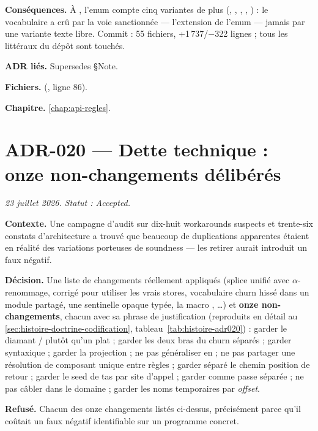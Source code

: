 \textbf{Conséquences.} À \code{\snapshotCommit}, l'enum  compte
cinq variantes de plus (, , ,
, ) : le vocabulaire a crû par la voie
sanctionnée --- l'extension de l'enum --- jamais par une variante texte libre.
Commit  : 55 fichiers, +1\,737/$-$322 lignes ; tous les
littéraux  du dépôt sont touchés.

\textbf{ADR liés.} Supersedes  §Note.

\textbf{Fichiers.}  (, ligne 86).

\textbf{Chapitre.} \cref{chap:api-regles}.

\section{ADR-020 --- Dette technique : onze non-changements délibérés}
\label{adr:20}
\noindent\textit{23 juillet 2026. Statut : Accepted.}

\textbf{Contexte.} Une campagne d'audit sur dix-huit \og workarounds\fg{}
suspects et trente-six constats d'architecture a trouvé que beaucoup de
\og duplications\fg{} apparentes étaient en réalité des variations porteuses
de soundness --- les retirer aurait introduit un faux négatif.

\textbf{Décision.} Une liste de changements réellement appliqués (splice
unifié avec $\alpha$-renommage,  corrigé pour utiliser
les vrais stores, vocabulaire churn hissé dans un module partagé, une
sentinelle opaque typée, la macro , \ldots)
et \textbf{onze non-changements}, chacun avec sa phrase de justification
(reproduits en détail au \cref{sec:histoire-doctrine-codification}, tableau~\ref{tab:histoire-adr020}) :
garder le diamant \code{\&\&}/\code{||} plutôt qu'un  plat ;
garder les deux bras du churn séparés ; garder 
syntaxique ; garder la projection  ; ne pas généraliser en
 ; ne pas partager une résolution de composant
unique entre règles ; garder séparé le chemin \og position de retour\fg{} ;
garder le seed de tas par site d'appel ; garder 
comme passe séparée ; ne pas câbler  dans le domaine ; garder les
noms temporaires par \emph{offset}.

\textbf{Refusé.} Chacun des onze changements listés ci-dessus, précisément
parce qu'il coûtait un faux négatif identifiable sur un programme concret.

